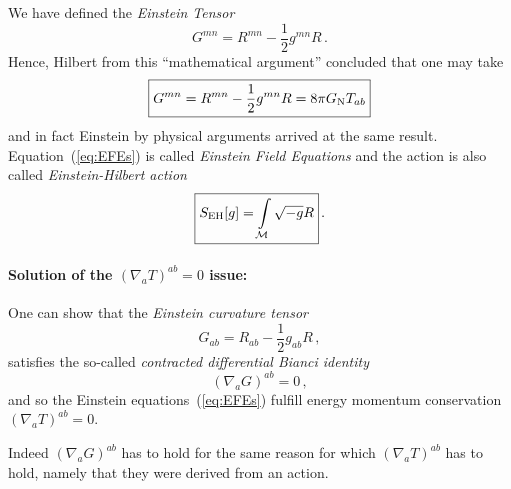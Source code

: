\begin{itemize}
        We have defined the \textit{Einstein Tensor}
        \begin{equation}
            G^{mn} = R^{mn} - \frac{1}{2} g^{mn} R \,.
        \end{equation}
        Hence, Hilbert from this ``mathematical argument'' concluded that
        one may take
        \begin{equation}
            \boxed{%
            G^{mn} = R^{mn} - \frac{1}{2} g^{mn} R = 8 \pi G_\text{N} T_{ab}
        }
        \label{eq:EFEs}
        \end{equation}
        and in fact Einstein by physical arguments arrived at the same result.
        Equation~(\ref{eq:EFEs}) is called \textit{Einstein Field Equations} and the action is
        also called \textit{Einstein-Hilbert action}
        \begin{equation}
            \boxed{%
                S_\text{EH}[g] = \int\limits_\M \sqrt{-g} R
            }\,.
        \end{equation}
\end{itemize}
\paragraph{Solution of the $(\nabla_a T)^{ab} = 0$ issue:}
One can show that the \textit{Einstein curvature tensor}
\begin{equation}
    G_{ab} = R_{ab} - \frac{1}{2} g_{ab} R\,,
\end{equation}
satisfies the so-called \emph{contracted differential Bianci identity}
\begin{equation}
    (\nabla_a G)^{ab} = 0\,,
\end{equation}
and so the Einstein equations~(\ref{eq:EFEs}) fulfill energy momentum conservation
$(\nabla_a T)^{ab} = 0$.
\begin{note}
    Indeed $(\nabla_a G)^{ab}$ has to hold for the same reason for which
    $(\nabla_a T)^{ab}$ has to hold, namely that they were derived from
    an action.
\end{note}

